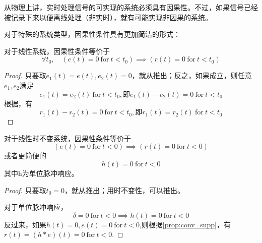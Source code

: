 从物理上讲，实时处理信号的可实现的系统必须具有因果性。不过，如果信号已经被记录下来以便离线处理（非实时），就有可能实现非因果的系统\cite{dsp}。

对于特殊的系统类型，因果性条件具有更加简洁的形式：

\begin{proposition}
对于线性系统，因果性条件等价于
\begin{equation}
    \forall t_0,\quad \left(e(t)=0\ \mathrm{for}\ t<t_0\right)\implies \left(r(t)=0\ \mathrm{for}\ t<t_0\right)\label{eq:4.2}
\end{equation}
\end{proposition}
\begin{proof}
只要取$e_1(t)=e(t),e_2(t)=0$，就从推出；反之，如果成立，则任意$e_1,e_2$满足
$$e_1(t)=e_2(t)\ \mathrm{for}\ t<t_0,\text{即}e_1(t)-e_2(t)=0\ \mathrm{for}\ t<t_0$$
根据，有
$$r_1(t)-r_2(t)=0\ \mathrm{for}\ t<t_0,\text{即}r_1(t)=r_2(t)\ \mathrm{for}\ t<t_0$$
\end{proof}

\begin{proposition}
对于线性时不变系统，因果性条件等价于
\begin{equation}
    \left(e(t)=0\ \mathrm{for}\ t<0\right)\implies \left(r(t)=0\ \mathrm{for}\ t<0\right)\label{eq:4.3}
\end{equation}
或者更简便的
\begin{equation}
    h(t)=0\ \mathrm{for}\ t<0\label{eq:4.4}
\end{equation}
其中h为单位脉冲响应。
\end{proposition}
\begin{proof}
只要取$t_0=0$，就从推出；用时不变性，可以推出。

对于单位脉冲响应，
$$\delta=0\ \mathrm{for}\ t<0\implies h(t)=0\ \mathrm{for}\ t<0$$
反过来，如果$h(t)=0,e(t)=0\ \mathrm{for}\ t<0$,则根据\cref{prop:conv_supp}，有$r(t)=(h*e)(t)=0\ \mathrm{for}\ t<0$.
\end{proof}
